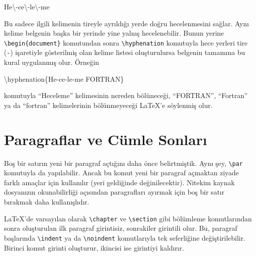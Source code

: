 \documentclass[
  letterpaper,
  DIV=11,
  numbers=noendperiod]{scrreprt}
\newenvironment{Shaded}{\begin{snugshade}}{\end{snugshade}}
\newcommand{\FunctionTok}[1]{\textcolor[rgb]{0.28,0.35,0.67}{#1}}
\newcommand{\NormalTok}[1]{\textcolor[rgb]{0.00,0.23,0.31}{#1}}
\begin{document}
\begin{Shaded}
\begin{Highlighting}[]
\NormalTok{He}\FunctionTok{\textbackslash{}{-}}\NormalTok{ce}\FunctionTok{\textbackslash{}{-}}\NormalTok{le}\FunctionTok{\textbackslash{}{-}}\NormalTok{me}
\end{Highlighting}
\end{Shaded}

Bu sadece ilgili kelimenin tireyle ayrıldığı yerde doğru hecelenmesini
sağlar. Aynı kelime belgenin başka bir yerinde yine yalnış
hecelenebilir. Bunun yerine \texttt{\textbackslash{}begin\{document\}}
komutundan sonra \texttt{\textbackslash{}hyphenation} komutuyla hece
yerleri tire (\texttt{-}) işaretiyle gösterilmiş olan kelime listesi
oluşturulursa belgenin tamamına bu kural uygulanmış olur. Örneğin

\begin{Shaded}
\begin{Highlighting}[]
\FunctionTok{\textbackslash{}hyphenation}\NormalTok{\{He{-}ce{-}le{-}me FORTRAN\}}
\end{Highlighting}
\end{Shaded}

komutuyla ``Heceleme'' kelimesinin nereden bölüneceği, ``FORTRAN'',
``Fortran'' ya da ``fortran'' kelimelerinin bölünmeyeceği {\LaTeX}'e
söylenmiş olur.

\hypertarget{paragraflar-ve-cuxfcmle-sonlarux131}{%
\section{Paragraflar ve Cümle
Sonları}\label{paragraflar-ve-cuxfcmle-sonlarux131}}

Boş bir satırın yeni bir paragraf açtığını daha önce belirtmiştik. Aynı
şey, \texttt{\textbackslash{}par} komutuyla da yapılabilir. Ancak bu
komut yeni bir paragraf açmaktan ziyade farklı amaçlar için kullanılır
(yeri geldiğinde değinilecektir). Nitekim kaynak dosyanızın
okunabilirliği açısından paragrafları ayırmak için boş bir satır
bırakmak daha kullanışlıdır.

{\LaTeX}'de varsayılan olarak \texttt{\textbackslash{}chapter} ve
\texttt{\textbackslash{}section} gibi bölümleme komutlarından sonra
oluşturulan ilk paragraf girintisiz, sonrakiler girintili olur. Bu,
paragraf başlarında \texttt{\textbackslash{}indent} ya da
\texttt{\textbackslash{}noindent} komutlarıyla tek seferliğine
değiştirilebilir. Birinci komut girinti oluşturur, ikincisi ise
girintiyi kaldırır.
\end{document}
